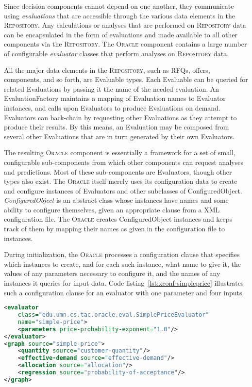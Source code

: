 \documentclass{article}
\begin{document}

Since decision components cannot depend on one another, they communicate
using \emph{evaluations} that are accessible through the various data
elements in the \textsc{Repository}.  Any calculations or analyses that
are performed on \textsc{Repository} data can be encapsulated in the
form of evaluations and made available to all other components via the
\textsc{Repository}.  The \textsc{Oracle} component contains a large
number of configurable \emph{evaluator} classes that perform analyses
on \textsc{Repository} data.

All the major data elements in the \textsc{Repository}, such as RFQs,
offers, components, and so forth, are Evaluable types.  Each Evaluable can
be queried for related Evaluations by passing it the name of the needed
evaluation.  An EvaluationFactory maintains a mapping of Evaluation
names to Evaluator instances, and calls upon Evaluators to produce
Evaluations on demand.  Evaluators can back-chain by requesting other
Evaluations as they attempt to produce their results.  By this means,
an Evaluation may be composed from several other Evaluations that are
in turn generated by their own Evaluators.

The resulting \textsc{Oracle} component is essentially a framework for
a set of small, configurable sub-components from which other components
can request analyses and predictions.  Most of these sub-components
are Evaluators, though other types also exist.  The \textsc{Oracle}
itself merely uses its configuration data to create and configure
instances of Evaluators and other subclasses of ConfiguredObject.
\emph{ConfiguredObject} is an abstract class whose instances have names
and some ability to configure themselves, given an appropriate clause from
a XML configuration file.  The \textsc{Oracle} creates ConfiguredObject
instances and keeps track of them by mapping their names as given in
the configuration file to instances.


During initialization, the \textsc{Oracle} processes a configuration
clause that specifies which instances to create, and for each such
instance, what name to give it, the values of any parameters necessary to
configure it, and the names of any instances it queries for input data.
Code listing~\ref{lst:xconf-simpleprice} illustrates such a configuration
clause for an evaluator with one parameter and four inputs.
\\  %
{\small
\begin{lstlisting}[language={XML},frame={single},belowcaptionskip=0.4cm,
label={lst:xconf-simpleprice},caption={Configuration clause for a price
evaluator that uses one parameter and several inputs}]
<evaluator
    class="edu.umn.cs.tac.oracle.eval.SimplePriceEvaluator"
    name="simple-price">
    <parameters price-probability-exponent="1.0"/>
</evaluator>
<graph source="simple-price">
    <quantity source="customer-quantity"/>
    <effective-demand source="effective-demand"/>
    <allocation source="allocation"/>
    <regression source="probability-of-acceptance"/>
</graph>
\end{lstlisting}
}
\end{document}

